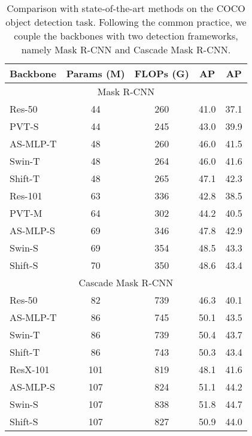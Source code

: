 \documentclass[letterpaper]{article} \usepackage{aaai22}  \usepackage{times}  \usepackage{helvet}  \usepackage{courier}  \usepackage[hyphens]{url}  \usepackage{graphicx} \usepackage{amsmath}
\begin{document}
\begin{table}[]
\centering
\caption{Comparison with state-of-the-art methods on the COCO object detection task. Following the common practice, we couple the backbones with two detection frameworks, namely Mask R-CNN and Cascade Mask R-CNN.}
\label{table:detection}
\begin{tabular}{l|cc|cc}
\toprule
Backbone       & Params (M) & FLOPs (G) & AP & AP \\ \midrule
\multicolumn{5}{c}{Mask R-CNN } \\ \midrule
Res-50         & 44     & 260   & 41.0     & 37.1     \\ 
PVT-S          & 44     & 245   & 43.0     & 39.9     \\
AS-MLP-T       & 48     & 260   & 46.0     & 41.5     \\
Swin-T         & 48     & 264   & 46.0     & 41.6     \\
\rowcolor{Bg} Shift-T   & 48    & 265       & 47.1     & 42.3     \\ \midrule
Res-101        & 63     & 336   & 42.8     & 38.5     \\ 
PVT-M          & 64     & 302   & 44.2     & 40.5     \\
AS-MLP-S       & 69     & 346   & 47.8     & 42.9     \\
Swin-S         & 69     & 354   & 48.5     & 43.3     \\
\rowcolor{Bg} Shift-S        & 70     & 350  & 48.6     & 43.4     \\ \midrule
\multicolumn{5}{c}{Cascade Mask R-CNN } \\ \midrule
Res-50         & 82     & 739   & 46.3     & 40.1     \\ 
AS-MLP-T       & 86     & 745   & 50.1     & 43.5     \\
Swin-T         & 86     & 739   & 50.4     & 43.7     \\
\rowcolor{Bg} Shift-T        & 86     & 743      & 50.3     & 43.4     \\ \midrule
ResX-101       & 101    & 819   & 48.1     & 41.6     \\
AS-MLP-S       & 107    & 824   & 51.1     & 44.2     \\
Swin-S         & 107    & 838   & 51.8     & 44.7     \\
\rowcolor{Bg} Shift-S        & 107    & 827      & 50.9     & 44.0     \\ \bottomrule
\end{tabular}
\end{table}
\end{document}
